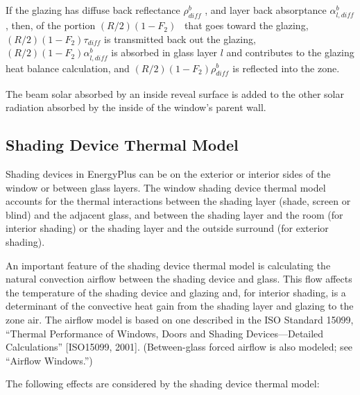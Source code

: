 If the glazing has diffuse back reflectance \(\rho_{diff}^b\) , and layer back absorptance \(\alpha_{l,diff}^b\) , then, of the portion \((R/2)(1 - {F_2})\) ~that goes toward the glazing, \((R/2)(1 - {F_2}){\tau_{diff}}\) is transmitted back out the glazing, \((R/2)(1 - {F_2})\alpha_{l,diff}^b\) is absorbed in glass layer \(l\) and contributes to the glazing heat balance calculation, and \((R/2)(1 - {F_2})\rho_{dif{f_{}}}^b\) is reflected into the zone.

The beam solar absorbed by an inside reveal surface is added to the other solar radiation absorbed by the inside of the window's parent wall.

\subsection{Shading Device Thermal Model}\label{shading-device-thermal-model}

Shading devices in EnergyPlus can be on the exterior or interior sides of the window or between glass layers. The window shading device thermal model accounts for the thermal interactions between the shading layer (shade, screen or blind) and the adjacent glass, and between the shading layer and the room (for interior shading) or the shading layer and the outside surround (for exterior shading).

An important feature of the shading device thermal model is calculating the natural convection airflow between the shading device and glass. This flow affects the temperature of the shading device and glazing and, for interior shading, is a determinant of the convective heat gain from the shading layer and glazing to the zone air. The airflow model is based on one described in the ISO Standard 15099, ``Thermal Performance of Windows, Doors and Shading Devices---Detailed Calculations'' {[}ISO15099, 2001{]}. (Between-glass forced airflow is also modeled; see ``Airflow Windows.'')

The following effects are considered by the shading device thermal model:

